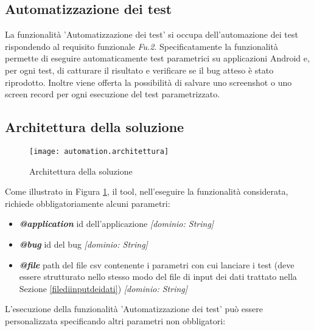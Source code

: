 \newpage %
\subsection{Automatizzazione dei test}
\label{sub:AutomatizzaTest}
La funzionalità 'Automatizzazione dei test' si occupa dell'automazione dei test rispondendo al requisito funzionale \emph{Fu.2}. Specificatamente la funzionalità permette di eseguire automaticamente test parametrici su applicazioni Android e, per ogni test, di catturare il risultato e verificare se il bug atteso è stato riprodotto. Inoltre viene offerta la possibilità di salvare uno screenshot o uno screen record per ogni esecuzione del test parametrizzato.


\subsection*{Architettura della soluzione}
\begin{figure}[H]
	\texttt{[image: automation.architettura]}
	\centering
	\caption{Architettura della soluzione}%
    \label{fig:autarch}
\end{figure}
Come illustrato in Figura \ref{fig:autarch}, il tool, nell'eseguire la funzionalità considerata, richiede obbligatoriamente alcuni parametri:
\begin{itemize} [nosep]
\item \textbf{\emph{@application}} id dell'applicazione \emph{[dominio: String]}
\item \textbf{\emph{@bug}} id del bug \emph{[dominio: String]}
\item \textbf{\emph{@file}} path del file csv contenente i parametri con cui lanciare i test (deve essere strutturato nello stesso modo del file di input dei dati trattato nella Sezione \ref{filediinputdeidati})  \emph{[dominio: String]} \newline
\end{itemize}
\noindent L'esecuzione della funzionalità 'Automatizzazione dei test' può essere personalizzata specificando altri parametri non obbligatori:
